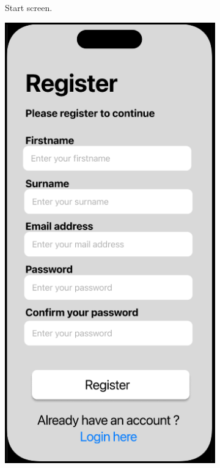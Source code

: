 \documentclass[11pt]{article}
\begin{document}
\begin{figure}[h!]
\begin{subfigure}[b]{0.3\textwidth}
         \caption{Start screen. \\ \mbox{}}
         \label{fig:startscreen}
     \end{subfigure}
     \hfill
     \begin{subfigure}[b]{0.3\textwidth}
         \centering
         \includegraphics[width=\textwidth]{figures/register.PNG}

\end{subfigure}
\end{figure}
\end{document}
